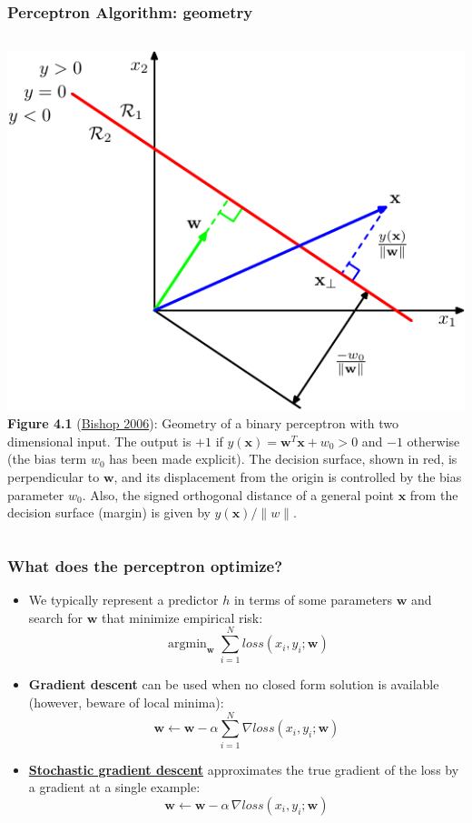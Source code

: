 \documentclass[ignorenonframetext,plain,fleqn]{beamer}
\DeclareMathOperator*{\argmin}{argmin}
\newcommand{\loss}{\mathit{loss}}
\renewcommand{\vec}{\mathbf}
\begin{document}
\begin{frame}\frametitle{Perceptron Algorithm: geometry}
\begin{columns}
\includegraphics[width=\textwidth]{images/bishop-fig-4-1.pdf}
\footnotesize {\bf Figure 4.1}
(\href{http://research.microsoft.com/en-us/um/people/cmbishop/prml}{Bishop
  2006}): Geometry of a binary perceptron with two dimensional input.
The output is $+1$ if $y(\vec{x})=\vec{w}^T\vec{x}+w_0 > 0$ and $-1$
otherwise (the bias term $w_0$ has been made explicit).  The decision
surface, shown in red, is perpendicular to $\vec{w}$, and its
displacement from the origin is controlled by the bias parameter
$w_0$. Also, the signed orthogonal distance of a general point
$\vec{x}$ from the decision surface (margin) is given by
$y(\vec{x})/\|w\|$.
\end{columns}
\end{frame}


\begin{frame}\frametitle{What does the perceptron optimize?}
\begin{itemize}
\item We typically represent a predictor $h$ in terms of some parameters
  $\vec{w}$ and search for $\vec{w}$ that minimize empirical
  risk: \[ 
  \argmin_\vec{w} \sum_{i=1}^N \loss(x_i, y_i; \vec{w})
  \]
\item {\bf Gradient descent} can be used when no closed form solution
  is available (however, beware of local minima): \[ \vec{w} \leftarrow
  \vec{w} - \alpha \sum_{i=1}^N \nabla \loss(x_i, y_i; \vec{w})
\]
\item {\bf
  \href{http://en.wikipedia.org/wiki/Stochastic_gradient_descent}
       {Stochastic gradient descent}} approximates the true gradient 
  of the loss by a gradient at a single example: \[ \vec{w}
  \leftarrow \vec{w} - \alpha\, \nabla \loss(x_i, y_i; \vec{w})
\]
\end{itemize}
\end{frame}
\end{document}
